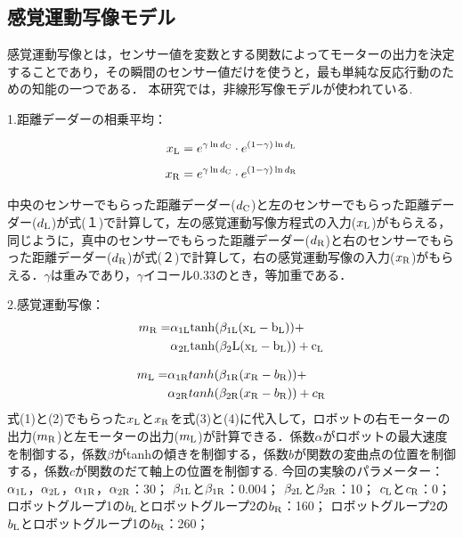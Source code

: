 \documentclass[twocolumn]{jarticle} %
\begin{document}
\subsection{感覚運動写像モデル}

感覚運動写像とは，センサー値を変数とする関数によってモーターの出力を決定することであり，その瞬間のセンサー値だけを使うと，最も単純な反応行動のための知能の一つである．
本研究では，非線形写像モデルが使われている.

1.距離デーダーの相乗平均：

\begin{equation}
  x_{\rm L} = e^{\gamma \ln d_{\rm C}} \cdot e^{(1-\gamma)\ln d_{\rm L}} 
\end{equation}
\begin{equation}
  x_{\rm R} = e^{\gamma \ln d_{\rm C}} \cdot e^{(1-\gamma)\ln d_{\rm R}} 
\end{equation}

中央のセンサーでもらった距離デーダー($d_{\rm C}$)と左のセンサーでもらった距離デーダー($d_{\rm L}$)が式(１)で計算して，左の感覚運動写像方程式の入力($x_{\rm L}$)がもらえる，同じように，真中のセンサーでもらった距離デーダー($d_{\rm R}$)と右のセンサーでもらった距離デーダー($d_{\rm R}$)が式(２)で計算して，右の感覚運動写像の入力($x_{\rm R}$)がもらえる．$\gamma$は重みであり，$\gamma$イコール0.33のとき，等加重である．

2.感覚運動写像：
\begin{equation}
\begin{aligned}
  m_{\rm R} = &\alpha_{1{\rm L}} \rm tanh(\beta_{1{\rm L}}(x_{\rm L} - b_{\rm L})) + \\
        &\alpha_{2{\rm L}} \rm tanh(\beta_2{\rm L}(x_{\rm L} - b_{\rm L})) + c_{\rm L}
\end{aligned}
\end{equation}

\begin{equation}
\begin{aligned}
  m_{\rm L} = &\alpha_{1{\rm R}}tanh(\beta_{1{\rm R}}(x_{\rm R} - b_{\rm R})) + \\
        &\alpha_{2{\rm R}}tanh(\beta_{2{\rm R}}(x_{\rm R} - b_{\rm R})) + c_{\rm R}
\end{aligned}
\end{equation}
式(1)と(2)でもらった$x_{\rm L}$と$x_{\rm R}$を式(3)と(4)に代入して，ロボットの右モーターの出力($m_{\rm R}$)と左モーターの出力($m_{\rm L}$)が計算できる．係数$\alpha$がロボットの最大速度を制御する，係数$\beta$が{\rm tanh}の傾きを制御する，係数$b$が関数の変曲点の位置を制御する，係数$c$が関数のだて軸上の位置を制御する. 
今回の実験のパラメーター：
$\alpha_{1{\rm L}}$，$\alpha_{2{\rm L}}$，$\alpha_{1{\rm R}}$，$\alpha_{2{\rm R}}$：30；
$\beta_{1{\rm L}}$と$\beta_{1{\rm R}}$：0.004；
$\beta_{2{\rm L}}$と$\beta_{2{\rm R}}$：10；
$c_{\rm L}$と$c_{\rm R}$：0；
ロボットグループ1の$b_{\rm L}$とロボットグループ2の$b_{\rm R}$：160；
ロボットグループ2の$b_{\rm L}$とロボットグループ1の$b_{\rm R}$：260；
\end{document}
